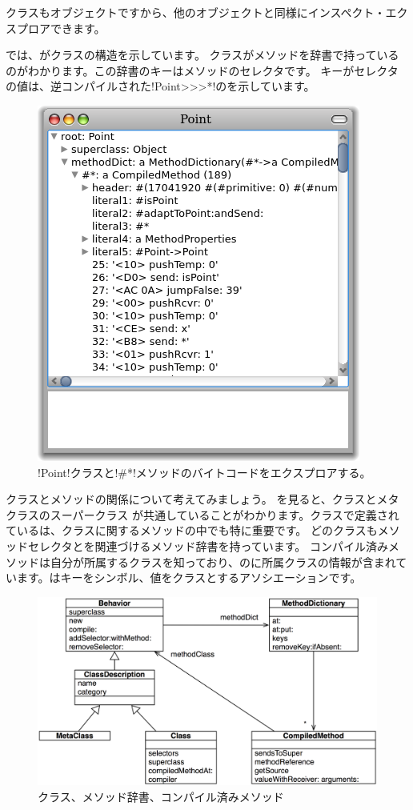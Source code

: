 \documentclass[a4paper,10pt,twoside]{book}
\begin{document}
クラスもオブジェクトですから、他のオブジェクトと同様にインスペクト・エクスプロアできます。


では、がクラスの構造を示しています。
クラスがメソッドを辞書で持っているのがわかります。この辞書のキーはメソッドのセレクタです。
キーがセレクタ \ct{#*} の値は、逆コンパイルされた\ct!Point>>>*!のを示しています。

\begin{figure}[ht]\centering
	\includegraphics[width=.5\linewidth]{CompiledMethod}
	\caption{\ct!Point!クラスと\ct!\#*!メソッドのバイトコードをエクスプロアする。}
\end{figure}

クラスとメソッドの関係について考えてみましょう。
を見ると、クラスとメタクラスのスーパークラス  が共通していることがわかります。クラスで定義されているは、クラスに関するメソッドの中でも特に重要です。
どのクラスもメソッドセレクタとを関連づけるメソッド辞書を持っています。
コンパイル済みメソッドは自分が所属するクラスを知っており、のに所属クラスの情報が含まれています。はキーをシンボル、値をクラスとするアソシエーションです。

\begin{figure}[ht]\centering
	\includegraphics[width=\linewidth]{MethodsAsObjects}
	\caption{クラス、メソッド辞書、コンパイル済みメソッド}
\end{figure}
\end{document}
